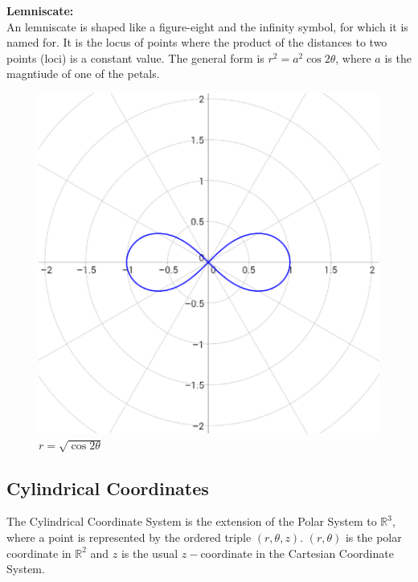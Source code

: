         \noindent \textbf{Lemniscate:} \\
        An lemniscate is shaped like a figure-eight and the infinity symbol, for which it is named for.
        It is the locus of points where the product of the distances to two points (loci) is a
        constant value. The general form is $r^2=a^2\cos{2\theta}$, where $a$ is the magntiude
        of one of the petals.

        \begin{figure} [hbt!]
            \centering
            \includegraphics[scale=0.4]{Resources/Unit3Vectors/lemniscate.PNG}
            \caption*{$r=\sqrt{\cos{2\theta}}$}
        \end{figure}



    \subsection{Cylindrical Coordinates}
        The Cylindrical Coordinate System is the extension of the Polar System to $\mathbb{R}^3$,
        where a point is represented by the ordered triple $(r,\theta,z)$. $(r,\theta)$ is the
        polar coordinate in $\mathbb{R}^2$ and $z$ is the usual $z-$coordinate in the Cartesian
        Coordinate System. \\

